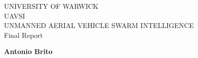 \documentclass{article}
\begin{document}
\begin{titlepage}
   \begin{center}
        \large UNIVERSITY OF WARWICK\\
       \vspace*{8cm}
        \Huge UAVSI
        \\
        \vspace{0.5cm}
        \normalsize UNMANNED AERIAL VEHICLE SWARM INTELLIGENCE
        \\
        \vspace{0.2cm}
        Final Report
            
       \vspace{5cm}

       \large \textbf{Antonio Brito}
			
			\smallskip

       \vfill

   \end{center}
\end{titlepage}




\newpage



\end{document}
